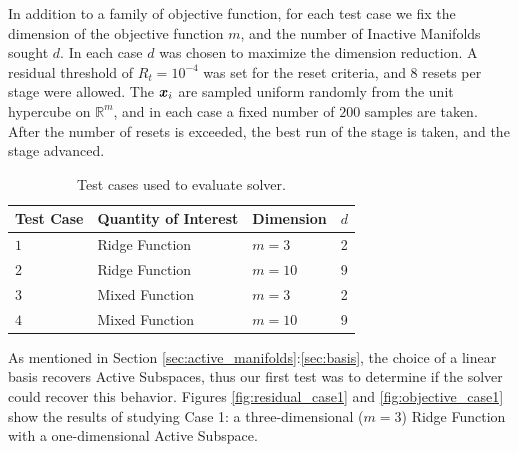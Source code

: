 \documentclass[]{aiaa-tc}%
\begin{document}
In addition to a family of objective function, for each test case we fix the dimension of the objective function $m$, and the number of Inactive Manifolds sought $d$. In each case $d$ was chosen to maximize the dimension reduction. A residual threshold of $R_t=10^{-4}$ was set for the reset criteria, and $8$ resets per stage were allowed. The $\boldsymbol{x}_i$ are sampled uniform randomly from the unit hypercube on $\mathbb{R}^m$, and in each case a fixed number of $200$ samples are taken. After the number of resets is exceeded, the best run of the stage is taken, and the stage advanced.

\begin{table}
\centering
\begin{tabular}{llll}
\toprule
Test Case & Quantity of Interest & Dimension & $d$\\
\midrule
$1$ & Ridge Function & $m=3$ & 2 \\
$2$ & Ridge Function & $m=10$ & 9 \\
$3$ & Mixed Function & $m=3$ & 2 \\
$4$ & Mixed Function & $m=10$ & 9 \\
\bottomrule
\end{tabular}
\caption{Test cases used to evaluate solver.}
\label{tab:tests}
\end{table}

As mentioned in Section \ref{sec:active_manifolds}:\ref{sec:basis}, the choice of a linear basis recovers Active Subspaces, thus our first test was to determine if the solver could recover this behavior. Figures \ref{fig:residual_case1} and \ref{fig:objective_case1} show the results of studying Case 1: a three-dimensional ($m=3$) Ridge Function with a one-dimensional Active Subspace.
\end{document}
